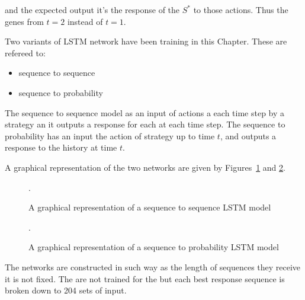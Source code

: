 and the expected output it's the response of the \(S^*\) to those actions.
Thus the genes from \(t=2\) instead of \(t=1\).

\begin{figure}[!htbp]
    \centering
    
\end{figure}

Two variants of LSTM network have been training in this Chapter. These are refereed to:

\begin{itemize}
    \item sequence to sequence
    \item sequence to probability
\end{itemize}

The sequence to sequence model as an input of actions a each time step by a strategy
an it outputs a response for each at each time step. The sequence to probability
has an input the action of strategy up to time \(t\), and outputs a response
to the history at time \(t\).

A graphical representation of the two networks are given by Figures~\ref{fig:sequence_to_sequence} and
\ref{fig:sequence_to_probability}.

\begin{figure}[!htbp]
    \centering
    
    \caption{A graphical representation of a sequence to sequence LSTM model}.\label{fig:sequence_to_sequence}
\end{figure}

\begin{figure}[!htbp]
    \centering
    
    \caption{A graphical representation of a sequence to probability LSTM model}.\label{fig:sequence_to_probability}
\end{figure}

The networks are constructed in such way as the length of sequences they receive
it is not fixed. The are not trained for the \totalsequences but each
best response sequence is broken down to 204 sets of input.

